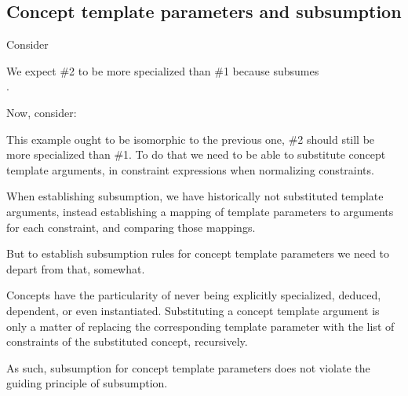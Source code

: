 \documentclass{wg21}
\begin{document}


\subsection{Concept template parameters and subsumption}

Consider

We expect \#2 to be more specialized than \#1 because  subsumes\\
.

Now, consider:



This example ought to be isomorphic to the previous one, \#2 should still be more specialized than \#1.
To do that we need to be able to substitute concept template arguments, in constraint expressions when normalizing constraints.

When establishing subsumption, we have historically not substituted template arguments, instead establishing a mapping of template parameters to arguments for each
constraint, and comparing those mappings.

But to establish subsumption rules for concept template parameters we need to depart from that, somewhat.

Concepts have the particularity of never being explicitly specialized, deduced, dependent, or even instantiated.
Substituting a concept template argument is only a matter of replacing the corresponding template parameter with the list of constraints of the substituted
concept, recursively.

As such, subsumption for concept template parameters does not violate the guiding principle of subsumption.
\end{document}
